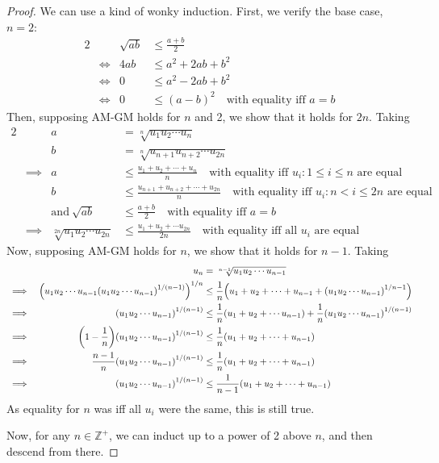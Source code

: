\documentclass[fleqn,a4paper,11pt]{article}
\newcommand{\setstyle}{\mathbb}
\newcommand{\Integers}{\setstyle Z}
\begin{document}
    \begin{proof}
    We can use a kind of wonky induction. First, we verify the base
    case, \(n = 2\):
    \begin{alignat*}{2}
    &&\sqrt{ab} &\le \frac{a + b}{2} \\
    &\iff& 4ab &\le a^2 + 2ab + b^2 \\
    &\iff& 0 &\le a^2 - 2ab + b^2 \\
    &\iff& 0 &\le (a - b)^2\quad \text{with equality iff \(a = b\)}
    \end{alignat*}
    Then, supposing AM-GM holds for \(n\) and 2, we show that it holds for
    \(2n\).  Taking
    \begin{alignat*}{2}
    &&a &= \sqrt[n]{u_1 u_2 \dotsm u_n} \\
    &&b &= \sqrt[n]{u_{n+1} u_{n+2} \dotsm u_{2n}} \\
    &\implies& a &\le \frac{u_1 + u_2 + \dotsb + u_n}{n}
            \quad \text{with equality iff \(u_i: 1 \le i \le n\) are equal}\\
    &&b &\le \frac{u_{n + 1} + u_{n + 2} + \dotsb + u_{2n}}{n}
            \quad \text{with equality iff \(u_i: n < i \le 2n\) are equal}\\
    &&\text{and}\ \sqrt{ab} &\le \frac{a + b}{2}
        \quad \text{with equality iff \(a = b\)}\\
    &\implies& \sqrt[2n]{u_1 u_2 \dotsm u_{2n}} &\le
             \frac{u_1 + u_2 + \dotsb u_{2n}}{2n}
                \quad \text{with equality iff all \(u_i\) are equal}
    \end{alignat*}
    Now, supposing AM-GM holds for \(n\), we show that it holds for \(n - 1\).
    Taking
    \begin{alignat*}{2}
    &&u_n &= \sqrt[n - 1]{u_1 u_2 \dotsm u_{n - 1}} \\
    &\implies& \pqty{u_1 u_2 \dotsm u_{n - 1}
                \pqty{u_1 u_2 \dotsm u_{n - 1}}^{1 / (n - 1)}}^{1 / n}
             &\le \frac 1n \pqty{u_1 + u_2 + \dotsb  + u_{n - 1} +
                \pqty{u_1 u_2 \dotsm u_{n - 1}}^{1/{n - 1}}} \\
    &\implies& \pqty{u_1 u_2 \dotsm u_{n - 1}}^{1 / (n - 1)} &\le
             \frac 1n \pqty{u_1 + u_2 + \dotsb u_{n - 1}} +
             \frac 1n \pqty{u_1 u_2 \dotsm u_{n - 1}}^{1 / (n - 1)} \\
    &\implies& \pqty{1 - \frac 1n}
             \pqty{u_1 u_2 \dotsm u_{n - 1}}^{1 / (n - 1)} &\le
             \frac 1n \pqty{u_1 + u_2 + \dotsb + u_{n - 1}} \\
    &\implies& \frac {n - 1}n
             \pqty{u_1 u_2 \dotsb u_{n - 1}}^{1 / (n - 1)} &\le
             \frac 1n \pqty{u_1 + u_2 + \dotsb + u_{n - 1}} \\
    &\implies& \pqty{u_1 u_2 \dotsm u_{n - 1}}^{1 / (n - 1)} &\le
             \frac 1{n - 1} \pqty{u_1 + u_2 + \dotsb + u_{n - 1}}
    \end{alignat*}
    As equality for \(n\) was iff all \(u_i\) were the same, this is still true.

    Now, for any \(n \in \Integers^+\), we can induct up to a power of 2 above
    \(n\), and then descend from there.
    \end{proof}
\end{document}
